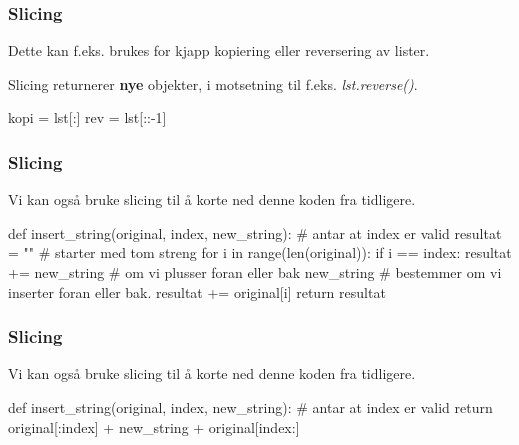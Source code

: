 \begin{frame}[fragile]
    \frametitle{Slicing}

    Dette kan f.eks. brukes for kjapp kopiering eller reversering av lister.

    Slicing returnerer \textbf{nye} objekter, i motsetning til f.eks. \textit{lst.reverse()}. 

\begin{python}
kopi = lst[:]
rev  = lst[::-1]
\end{python}

\end{frame}

\begin{frame}[fragile]
    \frametitle{Slicing}

    Vi kan også bruke slicing til å korte ned denne koden fra tidligere. 

\begin{python}
def insert_string(original, index, new_string):
    # antar at index er valid
    resultat = "" # starter med tom streng 
    for i in range(len(original)): 
        if i == index: 
            resultat += new_string 
        # om vi plusser foran eller bak new_string 
        # bestemmer om vi inserter foran eller bak. 
        resultat += original[i] 
    return resultat
\end{python}

\end{frame}

\begin{frame}[fragile]
    \frametitle{Slicing}

    Vi kan også bruke slicing til å korte ned denne koden fra tidligere. 

\begin{python}
def insert_string(original, index, new_string):
    # antar at index er valid
    return original[:index] + new_string + original[index:]
\end{python}

\end{frame}






































